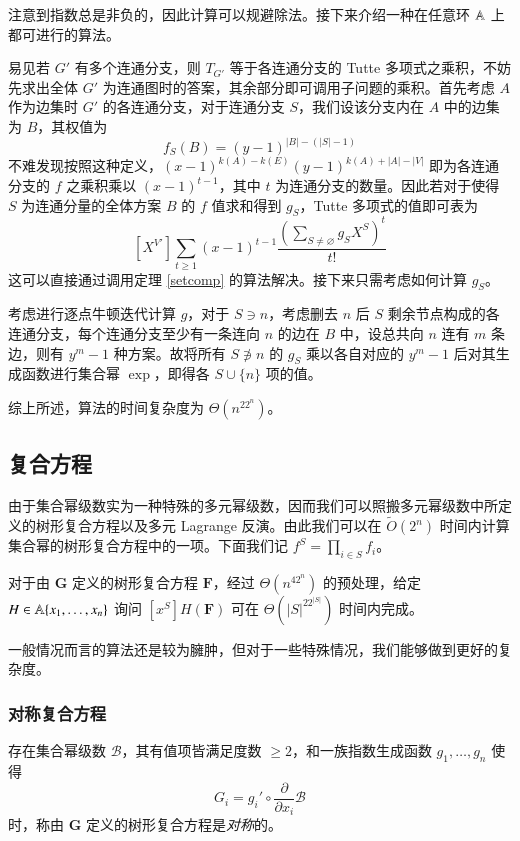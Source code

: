 注意到指数总是非负的，因此计算可以规避除法。接下来介绍一种在任意环 $\mathbb A$ 上都可进行的算法。

易见若 $G'$ 有多个连通分支，则 $T_{G'}$ 等于各连通分支的 Tutte 多项式之乘积，不妨先求出全体 $G'$ 为连通图时的答案，其余部分即可调用子问题的乘积。首先考虑 $A$ 作为边集时 $G'$ 的各连通分支，对于连通分支 $S$，我们设该分支内在 $A$ 中的边集为 $B$，其权值为
$$
f_S(B)=(y-1)^{|B|-(|S|-1)}
$$
不难发现按照这种定义，$(x-1)^{k(A)-k(E)}(y-1)^{k(A)+|A|-|V|}$ 即为各连通分支的 $f$ 之乘积乘以 $(x-1)^{t-1}$，其中 $t$ 为连通分支的数量。因此若对于使得 $S$ 为连通分量的全体方案 $B$ 的 $f$ 值求和得到 $g_S$，Tutte 多项式的值即可表为
$$
[X^{V'}] \sum_{t\ge 1} (x-1)^{t-1}\frac{\left( \sum_{S\neq \varnothing} g_S X^S \right)^t}{t!}
$$
这可以直接通过调用定理 \ref{setcomp} 的算法解决。接下来只需考虑如何计算 $g_S$。

考虑进行逐点牛顿迭代计算 $g$，对于 $S\ni n$，考虑删去 $n$ 后 $S$ 剩余节点构成的各连通分支，每个连通分支至少有一条连向 $n$ 的边在 $B$ 中，设总共向 $n$ 连有 $m$ 条边，则有 $y^m-1$ 种方案。故将所有 $S\not \ni n$ 的 $g_S$ 乘以各自对应的 $y^m-1$ 后对其生成函数进行集合幂 $\exp$，即得各 $S\cup \{n\}$ 项的值。

综上所述，算法的时间复杂度为 $\Theta(n^22^n)$。

\subsection{复合方程}

由于集合幂级数实为一种特殊的多元幂级数，因而我们可以照搬多元幂级数中所定义的树形复合方程以及多元 Lagrange 反演。由此我们可以在 $\tilde O(2^n)$ 时间内计算集合幂的树形复合方程中的一项。下面我们记 $f^S = \prod_{i\in S} f_i$。

\begin{theorem} \label{algocomp}
对于由 $\mathbf G$ 定义的树形复合方程 $\mathbf F$，经过 $\Theta(n^42^n)$ 的预处理，给定 $H \in \mathbb A\{x_1,\dots,x_n\}$ 询问 $[x^S] H(\mathbf F)$ 可在 $\Theta(|S|^22^{|S|})$ 时间内完成。
\end{theorem}

一般情况而言的算法还是较为臃肿，但对于一些特殊情况，我们能够做到更好的复杂度。

\subsubsection{对称复合方程}

\begin{definition}[对称复合方程]
存在集合幂级数 $\mathscr B$，其有值项皆满足度数 $\ge 2$，和一族指数生成函数 $g_1,\dots,g_n$ 使得
$$
G_i=g_i'\circ \frac{\partial}{\partial x_i} \mathscr B
$$
时，称由 $\mathbf G$ 定义的树形复合方程是\emph{对称}的。
\end{definition}

